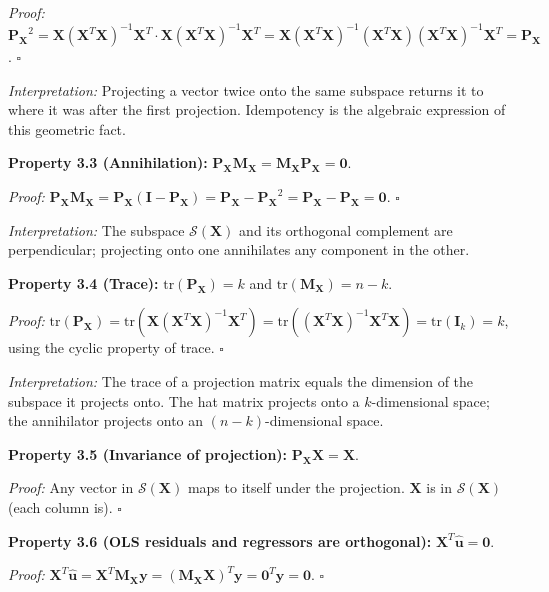\textit{Proof:} $\mathbf{P_X}^2 = \mathbf{X}(\mathbf{X}^T\mathbf{X})^{-1}\mathbf{X}^T \cdot \mathbf{X}(\mathbf{X}^T\mathbf{X})^{-1}\mathbf{X}^T = \mathbf{X}(\mathbf{X}^T\mathbf{X})^{-1}(\mathbf{X}^T\mathbf{X})(\mathbf{X}^T\mathbf{X})^{-1}\mathbf{X}^T = \mathbf{P_X}$. $\square$

\textit{Interpretation:} Projecting a vector twice onto the same subspace returns it to where it was after the first projection. Idempotency is the algebraic expression of this geometric fact.

\textbf{Property 3.3 (Annihilation):} $\mathbf{P_X}\mathbf{M_X} = \mathbf{M_X}\mathbf{P_X} = \mathbf{0}$.

\textit{Proof:} $\mathbf{P_X}\mathbf{M_X} = \mathbf{P_X}(\mathbf{I} - \mathbf{P_X}) = \mathbf{P_X} - \mathbf{P_X}^2 = \mathbf{P_X} - \mathbf{P_X} = \mathbf{0}$. $\square$

\textit{Interpretation:} The subspace $\mathcal{S}(\mathbf{X})$ and its orthogonal complement are perpendicular; projecting onto one annihilates any component in the other.

\textbf{Property 3.4 (Trace):} $\text{tr}(\mathbf{P_X}) = k$ and $\text{tr}(\mathbf{M_X}) = n - k$.

\textit{Proof:} $\text{tr}(\mathbf{P_X}) = \text{tr}(\mathbf{X}(\mathbf{X}^T\mathbf{X})^{-1}\mathbf{X}^T) = \text{tr}((\mathbf{X}^T\mathbf{X})^{-1}\mathbf{X}^T\mathbf{X}) = \text{tr}(\mathbf{I}_k) = k$, using the cyclic property of trace. $\square$

\textit{Interpretation:} The trace of a projection matrix equals the dimension of the subspace it projects onto. The hat matrix projects onto a $k$-dimensional space; the annihilator projects onto an $(n-k)$-dimensional space.

\textbf{Property 3.5 (Invariance of projection):} $\mathbf{P_X}\mathbf{X} = \mathbf{X}$.

\textit{Proof:} Any vector in $\mathcal{S}(\mathbf{X})$ maps to itself under the projection. $\mathbf{X}$ is in $\mathcal{S}(\mathbf{X})$ (each column is). $\square$

\textbf{Property 3.6 (OLS residuals and regressors are orthogonal):} $\mathbf{X}^T\hat{\mathbf{u}} = \mathbf{0}$.

\textit{Proof:} $\mathbf{X}^T\hat{\mathbf{u}} = \mathbf{X}^T\mathbf{M_X}\mathbf{y} = (\mathbf{M_X}\mathbf{X})^T\mathbf{y} = \mathbf{0}^T\mathbf{y} = \mathbf{0}$. $\square$

